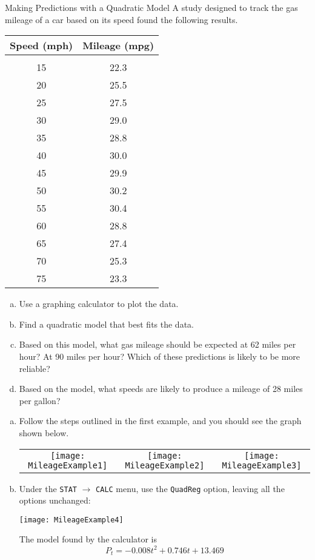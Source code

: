 \begin{example}{Making Predictions with a Quadratic Model}
A study designed to track the gas mileage of a car based on its speed found the following results.
\begin{center}
\begin{tabular}{c c}
\textbf{Speed (mph)} & \textbf{Mileage (mpg)}\\
\hline
& \\
15 & 22.3\\
20 & 25.5\\
25 & 27.5\\
30 & 29.0\\
35 & 28.8\\
40 & 30.0\\
45 & 29.9\\
50 & 30.2\\
55 & 30.4\\
60 & 28.8\\
65 & 27.4\\
70 & 25.3\\
75 & 23.3
\end{tabular}
\end{center}

\begin{enumerate}[(a)]
\item Use a graphing calculator to plot the data.
\item Find a quadratic model that best fits the data.
\item Based on this model, what gas mileage should be expected at 62 miles per hour?  At 90 miles per hour?  Which of these predictions is likely to be more reliable?
\item Based on the model, what speeds are likely to produce a mileage of 28 miles per gallon?
\end{enumerate}

\sol
\begin{enumerate}[(a)]
\item Follow the steps outlined in the first example, and you should see the graph shown below.
\begin{center}
\begin{tabular}{c c c}
\texttt{[image: MileageExample1]}
& \texttt{[image: MileageExample2]}
& \texttt{[image: MileageExample3]}
\end{tabular}
\end{center}

\item Under the \texttt{STAT} $\longrightarrow$ \texttt{CALC} menu, use the \texttt{QuadReg} option, leaving all the options unchanged:
\begin{center}
\texttt{[image: MileageExample4]}
\end{center}
The model found by the calculator is \[\boxed{P_t = -0.008t^2 + 0.746t + 13.469}\]
\pagebreak


\end{enumerate}
\end{example}
